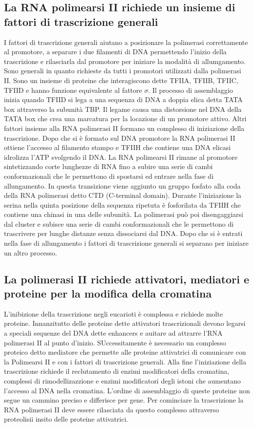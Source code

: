 \subsection{La RNA polimearsi II richiede un insieme di fattori di trascrizione generali}
I fattori di trascrizione generali aiutano a posizionare la polimerasi correttamente al promotore, a separare i due filamenti di DNA permettendo l'inizio della trascrizione e rilasciarla
dal promotore per iniziare la modalit\`a di allumgamento. Sono generali in quanto richieste da tutti i promotori utilizzati dalla polimerasi II. Sono un insieme di proteine che 
interagiscono dette TFIIA, TFIIB, TFIIC, TFIID e hanno funzione equivalente al fattore $\sigma$. Il processo di assemblaggio inizia quando TFIID si lega a una sequenza di DNA a doppia 
elica detta TATA box attraverso la subunit\`a TBP. Il legame causa una distorsione nel DNA della TATA box che crea una marcatura per la locazione di un promotore attivo. Altri fattori
insieme alla RNA polimerasi II formano un complesso di iniziazione della trascrizione. Dopo che si \`e formato sul DNA promotore la RNA polimerasi II ottiene l'accesso al filamento 
stampo e TFIIH che contiene una DNA elicasi idrolizza l'ATP svolgendo il DNA. La RNA polimearsi II rimane al promotore sintetizzando corte lunghezze di RNA fino a subire una serie di
cambi conformazionali che le permettono di spostarsi ed entrare nella fase di allungamento. In questa transizione viene aggiunto un gruppo fosfato alla coda della RNA polimerasi detto 
CTD (C-terminal domain). Durante l'iniziazione la serina nella quinta posizione della sequenza ripetuta \`e fosforilata da TFIIH che contiene una chinasi in una delle subunit\`a. La
polimerasi pu\`o poi disengaggiarsi dal cluster e subisce una serie di cambi conformazionali che le permettono di trascrivere per lunghe distanze senza dissociarsi dal DNA. Dopo che si
\`e entrati nella fase di allungamento i fattori di trascrizione generali si separano per iniziare un altro processo. 
\subsection{La polimerasi II richiede attivatori, mediatori e proteine per la modifica della cromatina}
L'inibizione della trascrizione negli eucarioti \`e complessa e richiede molte proteine. Innanzitutto delle proteine dette attivatori trascrizionali devono legarsi a speciali sequenze
del DNA dette enhancers e auitare ad attrarre l'RNA polimerasi II al punto d'inizio. SUccessitamente \`e necessario un complesso proteico detto mediatore che permette alle proteine 
attivatrici di comunicare con la Polimearsi II e con i fattori di trascrizione generali. Alla fine l'iniziazione della trascrizione richiede il reclutamento di enzimi modificatori della
cromatina, complessi di rimodellizazzione e enzimi modificatori degli istoni che aumentano l'accesso al DNA nella cromatina. L'ordine di assemblaggio di queste proteine non segue un 
cammino preciso e differisce per gene. Per cominciare la trascrizione la RNA polimerasi II deve essere rilasciata da questo complesso attraverso proteolisii insito delle proteine 
attivatrici.
